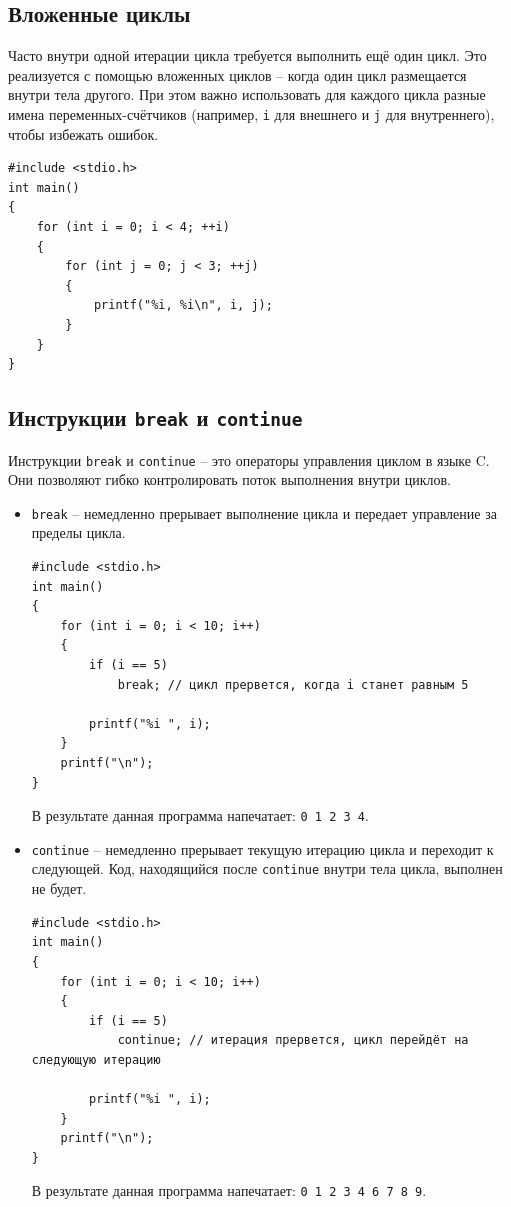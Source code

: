 \documentclass{article}
\begin{document}
\subsection*{Вложенные циклы}
Часто внутри одной итерации цикла требуется выполнить ещё один цикл. Это реализуется с помощью вложенных циклов -- когда один цикл размещается внутри тела другого. При этом важно использовать для каждого цикла разные имена переменных-счётчиков (например, \texttt{i} для внешнего и \texttt{j} для внутреннего), чтобы избежать ошибок.
\begin{lstlisting}
#include <stdio.h>
int main()
{
    for (int i = 0; i < 4; ++i)
    {
        for (int j = 0; j < 3; ++j)
        {
            printf("%i, %i\n", i, j);
        }
    }
}
\end{lstlisting}

\subsection*{Инструкции \texttt{break} и \texttt{continue}}
Инструкции \texttt{break} и \texttt{continue} -- это операторы управления циклом в языке C. Они позволяют гибко контролировать поток выполнения внутри циклов.
\begin{itemize}
\item \texttt{break} -- немедленно прерывает выполнение цикла и передает управление за пределы цикла.
\begin{lstlisting}
#include <stdio.h>
int main()
{
	for (int i = 0; i < 10; i++) 
	{
    	if (i == 5)
        	break; // цикл прервется, когда i станет равным 5
        
    	printf("%i ", i);
	}
	printf("\n");
}
\end{lstlisting}
В результате данная программа напечатает: \texttt{0 1 2 3 4}.

\item \texttt{continue} -- немедленно прерывает текущую итерацию цикла и переходит к следующей. Код, находящийся после \texttt{continue} внутри тела цикла, выполнен не будет.
\begin{lstlisting}
#include <stdio.h>
int main()
{
	for (int i = 0; i < 10; i++) 
	{
    	if (i == 5)
        	continue; // итерация прервется, цикл перейдёт на следующую итерацию
        
    	printf("%i ", i);
	}
	printf("\n");
}
\end{lstlisting}
В результате данная программа напечатает: \texttt{0 1 2 3 4 6 7 8 9}.
\end{itemize}
\end{document}
